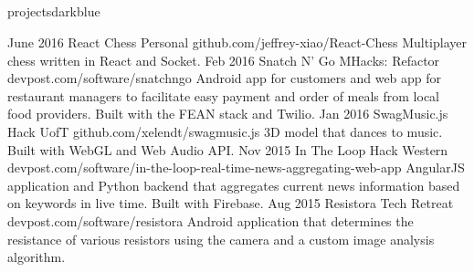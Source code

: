 \documentclass{resume}
\begin{document}
\begin{main}
		\section{\faFolder}{projects}{darkblue}
			\begin{entrylist}
				\rightentry%
					{June 2016}%
					{React Chess}%
					{Personal}%
					{github.com/jeffrey-xiao/React-Chess}%
					{Multiplayer chess written in React and Socket.}
				\rightentry%
					{Feb 2016}%
					{Snatch N' Go}%
					{MHacks: Refactor}%
					{devpost.com/software/snatchngo}%
					{Android app for customers and web app for restaurant managers to facilitate easy payment and order of meals from local food providers. Built with the FEAN stack and Twilio.}
				\rightentry%
					{Jan 2016}%
					{SwagMusic.js}%
					{Hack UofT}%
					{github.com/xelendt/swagmusic.js}%
					{3D model that dances to music. Built with WebGL and Web Audio API.}
				\rightentry%
					{Nov 2015}%
					{In The Loop}%
					{Hack Western}%
					{devpost.com/software/in-the-loop-real-time-news-aggregating-web-app}%
					{AngularJS application and Python backend that aggregates current news information based on keywords in live time. Built with Firebase.}
				\rightentry%
					{Aug 2015}%
					{Resistora}%
					{Tech Retreat}%
					{devpost.com/software/resistora}%
					{Android application that determines the resistance of various resistors using the camera and a custom image analysis algorithm.}
			\end{entrylist}	
	\end{main}
\end{document}

